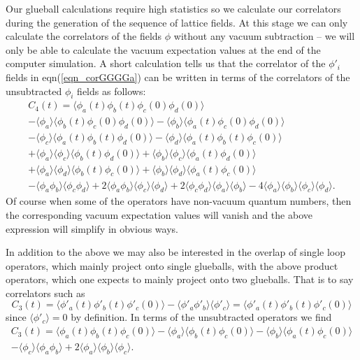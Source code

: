 \documentclass[12pt]{article}
\newcommand{\be}{\begin{equation}}
\newcommand{\ee}{\end{equation}}
\begin{document}
\begin{appendix}
Our glueball calculations require high statistics so we calculate our correlators during the
generation of the sequence of lattice fields. At this stage we can only calculate the correlators
of the fields $\phi$ without any vacuum subtraction -- we will only be able to calculate the
vacuum expectation values at the end of the computer simulation.
A short calculation tells us that the correlator of the $\phi'_i$ fields in eqn(\ref{eqn_corGGGGa})
can be written in terms of the correlators of the unsubtracted $\phi_i$ fields  as follows:
%
\begin{multline}
C_4(t) = \langle \phi_a(t)\phi_b(t) \phi_c(0)\phi_d(0) \rangle \\
-\langle\phi_a\rangle \langle\phi_b(t)\phi_c(0)\phi_d(0) \rangle
-\langle\phi_b\rangle \langle\phi_a(t)\phi_c(0)\phi_d(0) \rangle\\
-\langle\phi_c\rangle \langle\phi_a(t)\phi_b(t)\phi_d(0) \rangle
-\langle\phi_d\rangle \langle\phi_a(t)\phi_b(t)\phi_c(0) \rangle \\
+\langle\phi_a\rangle \langle\phi_c\rangle \langle \phi_b(t)\phi_d(0) \rangle
+\langle\phi_b\rangle \langle\phi_c\rangle \langle \phi_a(t)\phi_d(0) \rangle \\
+\langle\phi_a\rangle \langle\phi_d\rangle \langle \phi_b(t)\phi_c(0) \rangle
+\langle\phi_b\rangle \langle\phi_d\rangle \langle \phi_a(t)\phi_c(0) \rangle \\
-\langle\phi_a\phi_b\rangle \langle\phi_c\phi_d\rangle
+2\langle\phi_a\phi_b\rangle \langle\phi_c\rangle \langle\phi_d\rangle
+2\langle\phi_c\phi_d\rangle \langle\phi_a\rangle \langle\phi_b\rangle
-4\langle\phi_a\rangle \langle\phi_b\rangle \langle\phi_c\rangle \langle\phi_d\rangle.
\label{eqn_corGGGGb}
\end{multline}
%
Of course when some of the operators have non-vacuum quantum numbers, then the corresponding
vacuum expectation values will vanish and the above expression will simplify in obvious ways.

In addition to the above we may also be interested in the overlap of single loop operators,
which mainly project onto single glueballs, with the above product operators, which one
expects to mainly project onto two glueballs. That is to say correlators such as
%
\be
C_3(t) = \langle \phi'_a(t)\phi'_b(t) \phi'_c(0) \rangle
-\langle \phi'_a\phi'_b\rangle \langle \phi'_c\rangle
= \langle \phi'_a(t)\phi'_b(t) \phi'_c(0) \rangle
\label{eqn_corGGGa}
\ee
%
since $\langle \phi'_c\rangle=0$ by definition. In terms of the unsubtracted operators we find
%
\begin{multline}
C_3(t) = \langle \phi_a(t)\phi_b(t) \phi_c(0) \rangle 
-\langle\phi_a\rangle \langle\phi_b(t)\phi_c(0) \rangle
-\langle\phi_b\rangle \langle\phi_a(t)\phi_c(0) \rangle \\
-\langle\phi_c\rangle \langle\phi_a\phi_b\rangle
+2\langle\phi_a\rangle \langle\phi_b\rangle \langle\phi_c\rangle. 
\label{eqn_corGGGb}
\end{multline}
%


\end{appendix}
\end{document}
